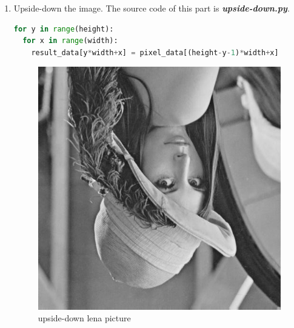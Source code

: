 \documentclass[12pt,twoside,a4paper]{article}
\begin{document}
\begin{enumerate}

\item
Upside-down the image. The source code of this part is \textit{\textbf{upside-down.py}}.
\begin{lstlisting}[language=Python]
for y in range(height):
  for x in range(width):
    result_data[y*width+x] = pixel_data[(height-y-1)*width+x]
\end{lstlisting}
\begin{figure}[H]
\centering
\includegraphics[scale=0.4]{lena-ud.jpg}
\caption{upside-down lena picture}
\label{fig:lena-ud.jpg}
\end{figure}


\end{enumerate}
\end{document}
